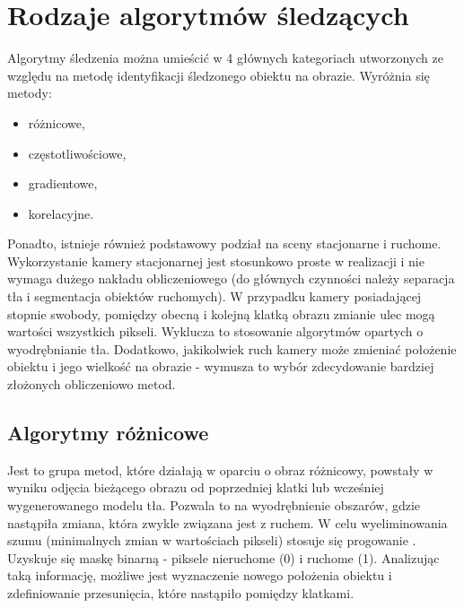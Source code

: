 


\section{Rodzaje algorytmów śledzących}
\label{sec:algorytmySledzace}

Algorytmy śledzenia można umieścić w 4 głównych kategoriach utworzonych ze względu na metodę identyfikacji śledzonego obiektu na obrazie. 
Wyróżnia się metody:
\begin{itemize}
	\item różnicowe,
	\item częstotliwościowe,
	\item gradientowe,
	\item korelacyjne.
\end{itemize}

Ponadto, istnieje również podstawowy podział na sceny stacjonarne i ruchome. 
Wykorzystanie kamery stacjonarnej jest stosunkowo proste w realizacji i nie wymaga dużego nakładu obliczeniowego (do głównych czynności należy separacja tła i segmentacja obiektów ruchomych). %
W przypadku kamery posiadającej stopnie swobody, pomiędzy obecną i kolejną klatką obrazu zmianie ulec mogą wartości wszystkich pikseli. %
Wyklucza to stosowanie algorytmów opartych o wyodrębnianie tła. 
Dodatkowo, jakikolwiek ruch kamery może zmieniać położenie obiektu i jego wielkość na obrazie - wymusza to wybór zdecydowanie bardziej złożonych obliczeniowo metod. %

\subsection{Algorytmy różnicowe}

Jest to grupa metod, które działają w oparciu o obraz różnicowy, powstały w wyniku odjęcia bieżącego obrazu od poprzedniej klatki lub wcześniej wygenerowanego modelu tła. %
Pozwala to na wyodrębnienie obszarów, gdzie nastąpiła zmiana, która zwykle związana jest z ruchem. %
W celu wyeliminowania szumu (minimalnych zmian w wartościach pikseli) stosuje się progowanie \cite{Rosin}. 
Uzyskuje się maskę binarną - piksele nieruchome (0) i ruchome (1). 
Analizując taką informację, możliwe jest wyznaczenie nowego położenia obiektu i zdefiniowanie przesunięcia, które nastąpiło pomiędzy klatkami. 

